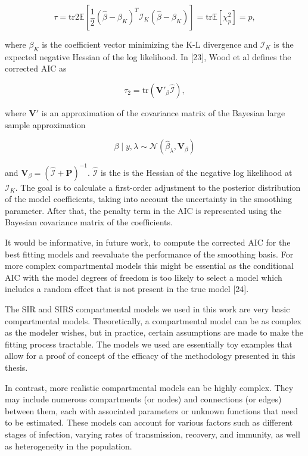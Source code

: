 \documentclass[
11pt, %
oneside, %
english, %
singlespacing, %
]{macthesis} %
\begin{document}
\[
\tau = \text{tr}2\mathbb{E}\left[\frac{1}{2} (\hat{\beta} - \beta_K)^T \mathbf{ \mathcal{I}}_K (\hat{\beta} - \beta_K)\right] = \text{tr}  \mathbb{E}[\chi^2_p] = p,
\]

where \(\beta_K\) is the coefficient vector minimizing the K-L divergence and \(\mathbf{ \mathcal{I}}_K\) is the expected negative Hessian of the log likelihood. In {[}23{]}, Wood et al defines the corrected AIC as

\[
\tau_2 = \text{tr}(\mathbf{V}'_{\beta}\hat{\mathbf{ \mathcal{I}}}),
\]

where \(\mathbf{V}'\) is an approximation of the covariance matrix of the Bayesian large sample approximation

\[
\beta \mid y,\lambda \sim \mathcal{N}(\hat{\beta}_{\lambda},\mathbf{V}_{\beta})
\]

and \(\mathbf{V}_{\beta} = (\hat{\mathbf{\mathcal{I}}} + \mathbf{P})^{-1}\). \(\hat{\mathbf{ \mathcal{I}}}\) is the is the Hessian of the negative log likelihood at \(\mathbf{ \mathcal{I}}_K\). The goal is to calculate a first-order adjustment to the posterior distribution of the model coefficients, taking into account the uncertainty in the smoothing parameter. After that, the penalty term in the AIC is represented using the Bayesian covariance matrix of the coefficients.

It would be informative, in future work, to compute the corrected AIC for the best fitting models and reevaluate the performance of the smoothing basis. For more complex compartmental models this might be essential as the conditional AIC with the model degrees of freedom is too likely to select a model which includes a random effect that is not present in the true model {[}24{]}.

The SIR and SIRS compartmental models we used in this work are very basic compartmental models. Theoretically, a compartmental model can be as complex as the modeler wishes, but in practice, certain assumptions are made to make the fitting process tractable. The models we used are essentially toy examples that allow for a proof of concept of the efficacy of the methodology presented in this thesis.

In contrast, more realistic compartmental models can be highly complex. They may include numerous compartments (or nodes) and connections (or edges) between them, each with associated parameters or unknown functions that need to be estimated. These models can account for various factors such as different stages of infection, varying rates of transmission, recovery, and immunity, as well as heterogeneity in the population.
\end{document}
